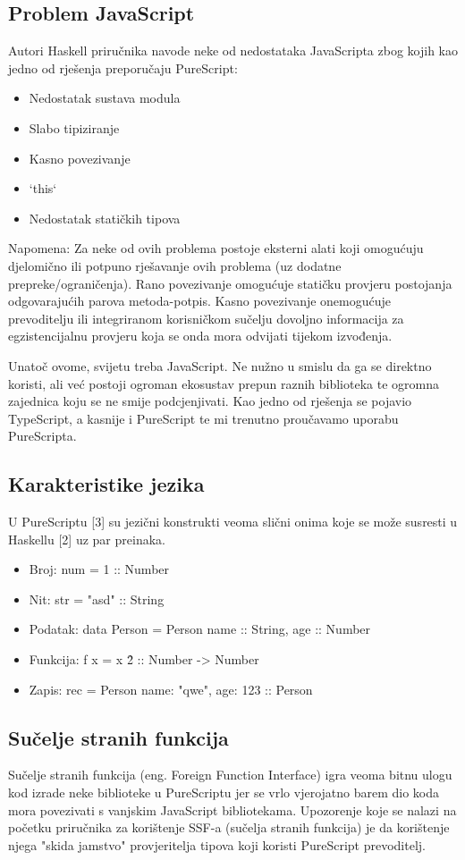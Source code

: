 \documentclass[times, utf8, zavrsni]{fer}
\begin{document}
\subsection{Problem JavaScript}
Autori Haskell priručnika navode neke od nedostataka JavaScripta zbog kojih kao jedno od rješenja preporučaju PureScript:
\begin{itemize}
\item Nedostatak sustava modula
\item Slabo tipiziranje
\item Kasno povezivanje
\item `this`
\item Nedostatak statičkih tipova
\end{itemize}

Napomena: Za neke od ovih problema postoje eksterni alati koji omogućuju djelomično ili potpuno rješavanje ovih problema (uz dodatne prepreke/ograničenja).
Rano povezivanje omogućuje statičku provjeru postojanja odgovarajućih parova metoda-potpis. Kasno povezivanje onemogućuje prevoditelju ili integriranom korisničkom sučelju dovoljno informacija za egzistencijalnu provjeru koja se onda mora odvijati tijekom izvođenja.

Unatoč ovome, svijetu treba JavaScript. Ne nužno u smislu da ga se direktno koristi, ali već postoji ogroman ekosustav prepun raznih biblioteka te ogromna zajednica koju se ne smije podcjenjivati. Kao jedno od rješenja se pojavio TypeScript, a kasnije i PureScript te mi trenutno proučavamo uporabu PureScripta.

\subsection{Karakteristike jezika}
U PureScriptu [3] su jezični konstrukti veoma slični onima koje se može susresti u Haskellu [2] uz par preinaka.

\begin{itemize}
\item Broj: num = 1 :: Number
\item Nit: str = "asd" :: String
\item Podatak: data Person = Person { name :: String, age :: Number }
\item Funkcija: f x = x \^ 2 :: Number -> Number
\item Zapis: rec = Person { name: "qwe", age: 123 } :: Person
\end{itemize}


\subsection{Sučelje stranih funkcija}
Sučelje stranih funkcija (eng. Foreign Function Interface) igra veoma bitnu ulogu kod izrade neke biblioteke u PureScriptu jer se vrlo vjerojatno barem dio koda mora povezivati s vanjskim JavaScript bibliotekama. Upozorenje koje se nalazi na početku priručnika za korištenje SSF-a (sučelja stranih funkcija) je da korištenje njega "skida jamstvo" provjeritelja tipova koji koristi PureScript prevoditelj. 
\end{document}
